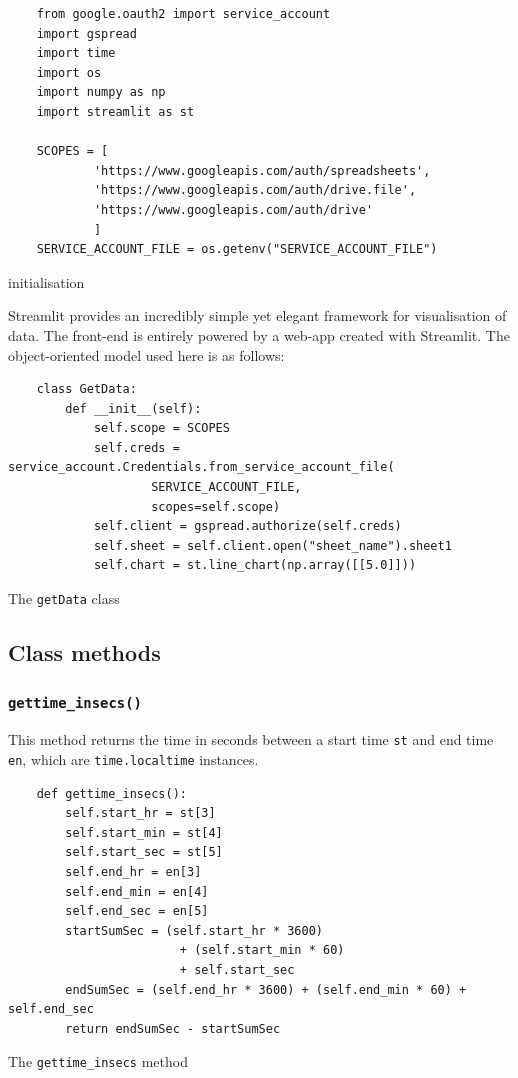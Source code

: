 \documentclass[a4paper,12pt]{report}
\newenvironment{code}{\captionsetup{type=listing}}{}
\begin{document}
\begin{code}
    \begin{verbatim}
    from google.oauth2 import service_account
    import gspread
    import time
    import os
    import numpy as np
    import streamlit as st

    SCOPES = [
            'https://www.googleapis.com/auth/spreadsheets',
            'https://www.googleapis.com/auth/drive.file',
            'https://www.googleapis.com/auth/drive'
            ]
    SERVICE_ACCOUNT_FILE = os.getenv("SERVICE_ACCOUNT_FILE")
    \end{verbatim}
    \caption{initialisation}
    \label{code:clsinit}
\end{code}
\vspace{0.5cm}

Streamlit provides an incredibly simple yet elegant framework for visualisation
of data. The front-end is entirely powered by a web-app created with Streamlit.
The object-oriented model used here is as follows:

\begin{code}
    \begin{verbatim}
    class GetData:
        def __init__(self):
            self.scope = SCOPES
            self.creds = service_account.Credentials.from_service_account_file(
                    SERVICE_ACCOUNT_FILE,
                    scopes=self.scope)
            self.client = gspread.authorize(self.creds)
            self.sheet = self.client.open("sheet_name").sheet1
            self.chart = st.line_chart(np.array([[5.0]]))
    \end{verbatim}
    \caption{The \texttt{getData} class}
    \label{code:getdatacls}
\end{code}

\subsection{Class methods}
\subsubsection{\texttt{gettime_insecs()}}
This method returns the time in seconds between a start time \texttt{st} and
end time \texttt{en}, which are \texttt{time.localtime} instances.

\begin{code}
    \begin{verbatim}
    def gettime_insecs():
        self.start_hr = st[3]
        self.start_min = st[4]
        self.start_sec = st[5]
        self.end_hr = en[3]
        self.end_min = en[4]
        self.end_sec = en[5]
        startSumSec = (self.start_hr * 3600)
                        + (self.start_min * 60)
                        + self.start_sec
        endSumSec = (self.end_hr * 3600) + (self.end_min * 60) + self.end_sec
        return endSumSec - startSumSec
    \end{verbatim}
    \caption{The \texttt{gettime_insecs} method}
    \label{code:gettime_insecs}
\end{code}
\end{document}
